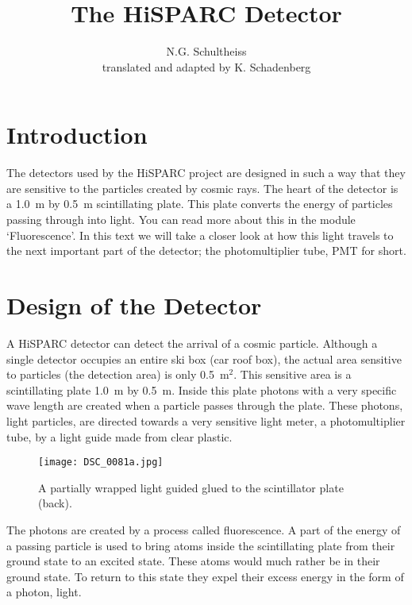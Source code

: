 


\author{N.G. Schultheiss \\ translated and adapted by K. Schadenberg}
\date{}
\title{The HiSPARC Detector}




\maketitle

\section{Introduction}
The detectors used by the HiSPARC project are designed in such a way that they are sensitive to the particles created by cosmic rays. The heart of the detector is a 1.0~m by 0.5~m scintillating plate. This plate converts the energy of particles passing through into light. You can read more about this in the module `Fluorescence'. In this text we will take a closer look at how this light travels to the next important part of the detector; the photomultiplier tube, PMT for short.

\section{Design of the Detector}
A HiSPARC detector can detect the arrival of a cosmic particle. Although a single detector occupies an entire ski box (car roof box), the actual area sensitive to particles (the detection area) is only 0.5~m$^2$. This sensitive area is a scintillating plate 1.0~m by 0.5~m. Inside this plate photons with a very specific wave length are created when a particle passes through the plate. These photons, light particles, are directed towards a very sensitive light meter, a photomultiplier tube, by a light guide made from clear plastic.

\begin{figure}[h]\begin{center}
\texttt{[image: DSC\_0081a.jpg]}%
\caption{A partially wrapped light guided glued to the scintillator plate (back). }\label{fig:light_guide}
\end{center}\end{figure}

The photons are created by a process called fluorescence. A part of the energy of a passing particle is used to bring atoms inside the scintillating plate from their ground state to an excited state. These atoms would much rather be in their ground state. To return to this state they expel their excess energy in the form of a photon, light.

